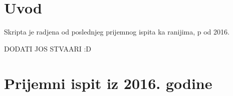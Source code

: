 \documentclass[a4paper,12pt]{report}
\begin{document}
\newpage








%
%


\section*{Uvod}
\par Skripta je radjena od poslednjeg prijemnog ispita ka ranijima, p od 2016.
\par DODATI JOS STVAARI :D

\newpage                            

\section*{Prijemni ispit iz 2016. godine}
\end{document}
